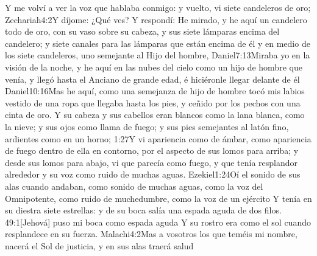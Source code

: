 Y me volví a ver la voz que hablaba conmigo: y vuelto, vi siete candeleros de oro;%
	{Zechariah}{4:2}{Y díjome: ¿Qué ves? Y respondí: He mirado, y he aquí un candelero todo de oro, con su vaso sobre su cabeza, y sus siete lámparas encima del candelero; y siete canales para las lámparas que están encima de él}
y en medio de los siete candeleros, uno semejante al Hijo del hombre,%
%
			{Daniel}{7:13}{Miraba yo en la visión de la noche, y he aquí en las nubes del cielo como un hijo de hombre que venía, y llegó hasta el Anciano de grande edad, é hiciéronle llegar delante de él}%
			{Daniel}{10:16}{Mas he aquí, como una semejanza de hijo de hombre tocó mis labios}%
 vestido de una ropa que llegaba hasta los pies, y ceñido por los pechos con una cinta de oro.%
Y su cabeza y sus cabellos eran blancos como la lana blanca, como la nieve;%
 y sus ojos como llama de fuego;%
y sus pies semejantes al latón fino, ardientes como en un horno;%
			{1:27}{Y vi apariencia como de ámbar, como apariencia de fuego dentro de ella en contorno, por el aspecto de sus lomos para arriba; y desde sus lomos para abajo, vi que parecía como fuego, y que tenía resplandor alrededor}%
 y su voz como ruido de muchas aguas.%
        		{Ezekiel}{1:24}{Oí el sonido de sus alas cuando andaban, como sonido de muchas aguas, como la voz del Omnipotente, como ruido de muchedumbre, como la voz de un ejército}
Y tenía en su diestra siete estrellas: y de su boca salía una espada aguda de dos filos.%
				{49:1}{[Jehová] puso mi boca como espada aguda}
 Y su rostro era como el sol cuando resplandece en su fuerza.%
			{Malachi}{4:2}{Mas a vosotros los que teméis mi nombre, nacerá el Sol de justicia, y en sus alas traerá salud}

